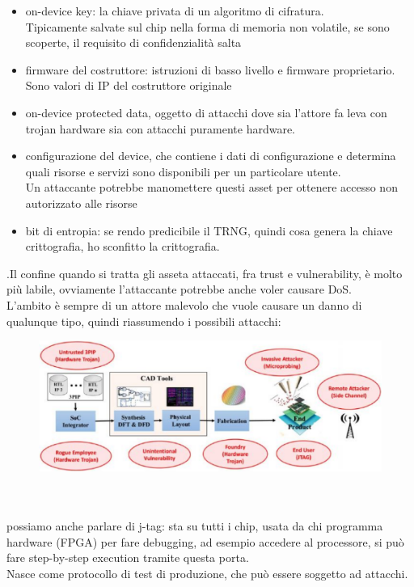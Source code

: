 \documentclass[oneside, 12pt]{extbook}
\begin{document}
\begin{itemize}
	\item on-device key: la chiave privata di un algoritmo di cifratura.
	\\Tipicamente salvate sul chip nella forma di memoria non volatile, se sono scoperte, il requisito di confidenzialità salta
	\item firmware del costruttore: istruzioni di basso livello e firmware proprietario.
	\\Sono valori di IP del costruttore originale 
	\item on-device protected data, oggetto di attacchi dove sia l'attore fa leva con trojan hardware sia con attacchi puramente hardware.
	\item configurazione del device, che contiene i dati di configurazione e determina quali risorse e servizi sono disponibili per un particolare utente.
	\\Un attaccante potrebbe manomettere questi asset per ottenere accesso non autorizzato alle risorse
	\item bit di entropia: se rendo predicibile il TRNG, quindi cosa genera la chiave crittografia, ho sconfitto la crittografia.
\end{itemize}
.Il confine quando si tratta gli asseta attaccati, fra trust e vulnerability, è molto più labile, ovviamente l'attaccante potrebbe anche voler causare DoS.
\\L'ambito è sempre di un attore malevolo che vuole causare un danno di qualunque tipo, quindi riassumendo i possibili attacchi:\\
\begin{figure}[!h]
	\includegraphics[scale=0.3]{immagini/hardware/attacks.png}
\end{figure}
\\\\possiamo anche parlare di j-tag: sta su tutti i chip, usata da chi programma hardware (FPGA) per fare debugging, ad esempio accedere al processore, si può fare step-by-step execution tramite questa porta.
\\Nasce come protocollo di test di produzione, che può essere soggetto ad attacchi.
\end{document}
